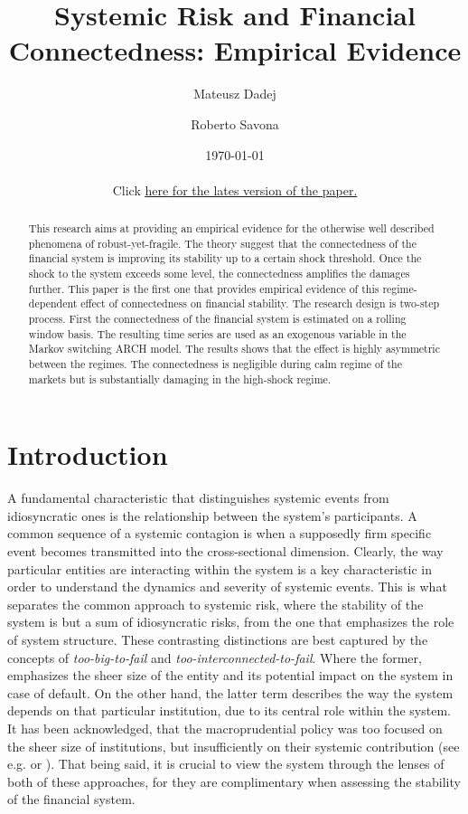\documentclass[12pt]{article}
\title{Systemic Risk and Financial Connectedness: Empirical Evidence}
\author[1]{Mateusz Dadej}
\author[1]{Roberto Savona}
\affil[1]{University of Brescia}
\date{\today \\ \text{} \\
\small{Click} \href{https://m-dadej.github.io/files/connectedness.pdf}{\small{\underline{here}} for the lates version of the paper.}\\}
\begin{document}
\maketitle

\begin{abstract}
This research aims at providing an empirical evidence for the otherwise well described phenomena of robust-yet-fragile. The theory suggest that the connectedness of the financial system is improving its stability up to a certain shock threshold. Once the shock to the system exceeds some level, the connectedness amplifies the damages further. This paper is the first one that provides empirical evidence of this regime-dependent effect of connectedness on financial stability. The research design is two-step process. First the connectedness of the financial system is estimated on a rolling window basis. The resulting time series are used as an exogenous variable in the Markov switching ARCH model. The results shows that the effect is highly asymmetric between the regimes. The connectedness is negligible during calm regime of the markets but is substantially damaging in the high-shock regime.
\end{abstract}

\newpage

\section{Introduction}\label{section:introduction}

A fundamental characteristic that distinguishes systemic events from idiosyncratic ones is the relationship between the system's participants. A common sequence of a systemic contagion is when a supposedly firm specific event becomes transmitted into the cross-sectional dimension. Clearly, the way particular entities are interacting within the system is a key characteristic in order to understand the dynamics and severity of systemic events. This is what separates the common approach to systemic risk, where the stability of the system is but a sum of idiosyncratic risks, from the one that emphasizes the role of system structure. These contrasting distinctions are best captured by the concepts of \textit{too-big-to-fail} and \textit{too-interconnected-to-fail}. Where the former, emphasizes the sheer size of the entity and its potential impact on the system in case of default. On the other hand, the latter term describes the way the system depends on that particular institution, due to its central role within the system. It has been acknowledged, that the macroprudential policy was too focused on the sheer size of institutions, but insufficiently on their systemic contribution (see e.g. \cite{bernanke09} or \cite{rajan09}). That being said, it is crucial to view the system through the lenses of both of these approaches, for they are complimentary when assessing the stability of the financial system.
\end{document}
